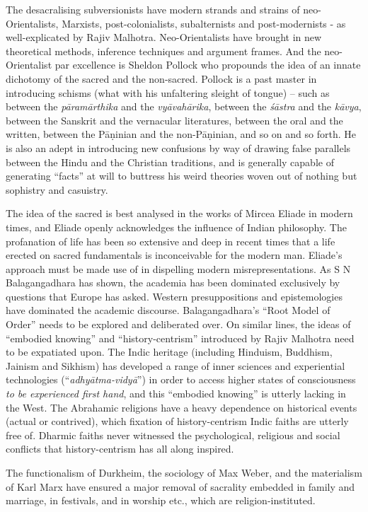 The desacralising subversionists have modern strands and strains of neo-Orientalists, Marxists, post-colonialists, subalternists and post-modernists - as well-explicated by Rajiv Malhotra. Neo-Orientalists have brought in new theoretical methods, inference techniques and argument frames. And the neo-Orientalist par excellence is Sheldon Pollock who propounds the idea of an innate dichotomy of the sacred and the non-sacred. Pollock is a past master in introducing schisms (what with his unfaltering sleight of tongue) – such as between the \textit{pāramārthika} and the \textit{vyāvahārika}, between the \textit{śāstra} and the \textit{kāvya}, between the Sanskrit and the vernacular literatures, between the oral and the written, between the Pāṇinian and the non-Pāṇinian, and so on and so forth. He is also an adept in introducing new confusions by way of drawing false parallels between the Hindu and the Christian traditions, and is generally capable of generating “facts” at will to buttress his weird theories woven out of nothing but sophistry and casuistry.

The idea of the sacred is best analysed in the works of Mircea Eliade in modern times, and Eliade openly acknowledges the influence of Indian philosophy. The profanation of life has been so extensive and deep in recent times that a life erected on sacred fundamentals is inconceivable for the modern man. Eliade’s approach must be made use of in dispelling modern misrepresentations. As S N Balagangadhara has shown, the academia has been dominated exclusively by questions that Europe has asked. Western presuppositions and epistemologies have dominated the academic discourse. Balagangadhara’s “Root Model of Order” needs to be explored and deliberated over. On similar lines, the ideas of “embodied knowing” and “history-centrism” introduced by Rajiv Malhotra need to be expatiated upon. The Indic heritage (including Hinduism, Buddhism, Jainism and Sikhism) has developed a range of inner sciences and experiential technologies (“\textit{adhyātma-vidyā}”) in order to access higher states of consciousness \textit{to be experienced first hand}, and this “embodied knowing” is utterly lacking in the West. The Abrahamic religions have a heavy dependence on historical events (actual or contrived), which fixation of history-centrism Indic faiths are utterly free of. Dharmic faiths never witnessed the psychological, religious and social conflicts that history-centrism has all along inspired.

The functionalism of Durkheim, the sociology of Max Weber, and the materialism of Karl Marx have ensured a major removal of sacrality embedded in family and marriage, in festivals, and in worship etc., which are religion-instituted.

